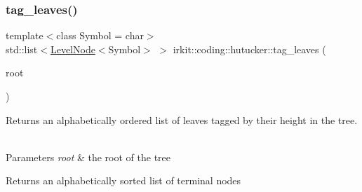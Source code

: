 \subsubsection{\texorpdfstring{tag\+\_\+leaves()}{tag\_leaves()}}
{\footnotesize\ttfamily template$<$class Symbol  = char$>$ \\
std\+::list$<$\mbox{\hyperlink{structirkit_1_1coding_1_1hutucker_1_1LevelNode}{Level\+Node}}$<$Symbol$>$ $>$ irkit\+::coding\+::hutucker\+::tag\+\_\+leaves (\begin{DoxyParamCaption}\item[{\mbox{\hyperlink{namespaceirkit_1_1coding_1_1hutucker_a3fd5bcbd5c6d608f75e0afbb7f171899}{Node\+Ptr}}$<$ Symbol $>$}]{root }\end{DoxyParamCaption})}

Returns an alphabetically ordered list of leaves tagged by their height in the tree. ~\newline



\begin{DoxyParams}{Parameters}
{\em root} & the root of the tree \\
\hline
\end{DoxyParams}
\begin{DoxyReturn}{Returns}
an alphabetically sorted list of terminal nodes 
\end{DoxyReturn}
